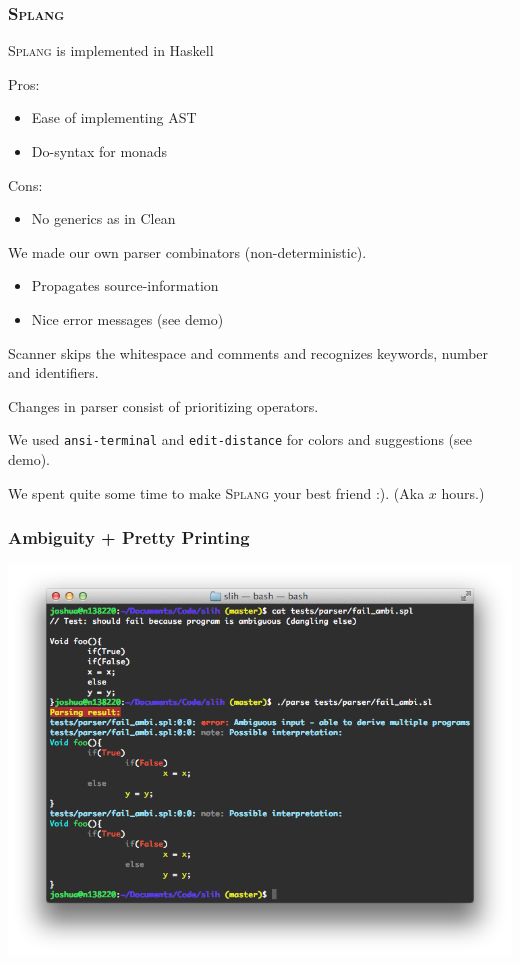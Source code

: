 \documentclass[14pt]{beamer}
\title{\splang}
\author{Wouter Geraedts \and Joshua Moerman}
\institute{Radboud Universiteit Nijmegen}
\date{}
\newcommand{\splang}{\textsc{Splang}\xspace}
\begin{document}
\begin{frame}
\titlepage
\end{frame}


\begin{frame}
\frametitle{\splang}
\splang is implemented in Haskell
\bigskip

Pros:
\begin{itemize}
	\item Ease of implementing AST
	\item Do-syntax for monads
\end{itemize}

Cons:
\begin{itemize}
	\item No generics as in Clean
\end{itemize}
\end{frame}


\begin{frame}
We made our own parser combinators (non-deterministic).
\begin{itemize}
	\item Propagates source-information
	\item Nice error messages (see demo)
\end{itemize}

Scanner skips the whitespace and comments and recognizes keywords, number and identifiers.

Changes in parser consist of prioritizing operators.
\end{frame}


\begin{frame}
We used \texttt{ansi-terminal} and \texttt{edit-distance} for colors and suggestions (see demo).

We spent quite some time to make \splang your best friend :). (Aka $x$ hours.)
\end{frame}


\begin{frame}
\frametitle{Ambiguity + Pretty Printing}
\begin{center}
\includegraphics[width=\textwidth]{ambi_pretty.png}
\end{center}
\end{frame}
\end{document}
